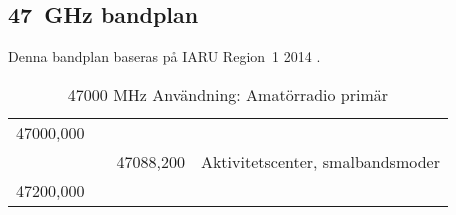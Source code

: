 \subsection{\qty{47}{\giga\hertz} bandplan}
\label{47GHzbandplan}
Denna bandplan baseras på IARU Region~1 2014 \cite{IARU1}.

\begin{table}[h]
  \caption{47000 MHz Användning: Amatörradio primär}
  \begin{xtabular}{llll}
47000,000 & & & \\
          & & 47088,200 & Aktivitetscenter, smalbandsmoder \\
47200,000 & & & \\
\end{xtabular}
\end{table}

\twocolumn

